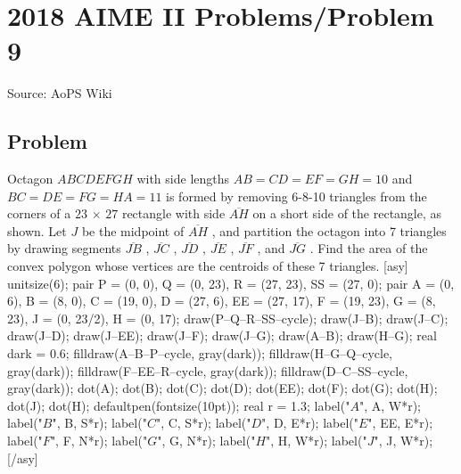 \documentclass[12pt]{article}
\begin{document}
\section*{{2018 AIME II Problems/Problem 9}}
Source: AoPS Wiki

\subsection*{Problem}
Octagon $ABCDEFGH$ with side lengths $AB = CD = EF = GH = 10$ and $BC = DE = FG = HA = 11$ is formed by removing 6-8-10 triangles from the corners of a $23$ $\times$ $27$ rectangle with side $\overline{AH}$ on a short side of the rectangle, as shown. Let $J$ be the midpoint of $\overline{AH}$ , and partition the octagon into 7 triangles by drawing segments $\overline{JB}$ , $\overline{JC}$ , $\overline{JD}$ , $\overline{JE}$ , $\overline{JF}$ , and $\overline{JG}$ . Find the area of the convex polygon whose vertices are the centroids of these 7 triangles. [asy] unitsize(6); pair P = (0, 0), Q = (0, 23), R = (27, 23), SS = (27, 0); pair A = (0, 6), B = (8, 0), C = (19, 0), D = (27, 6), EE = (27, 17), F = (19, 23), G = (8, 23), J = (0, 23/2), H = (0, 17); draw(P--Q--R--SS--cycle); draw(J--B); draw(J--C); draw(J--D); draw(J--EE); draw(J--F); draw(J--G); draw(A--B); draw(H--G); real dark = 0.6; filldraw(A--B--P--cycle, gray(dark)); filldraw(H--G--Q--cycle, gray(dark)); filldraw(F--EE--R--cycle, gray(dark)); filldraw(D--C--SS--cycle, gray(dark)); dot(A); dot(B); dot(C); dot(D); dot(EE); dot(F); dot(G); dot(H); dot(J); dot(H); defaultpen(fontsize(10pt)); real r = 1.3; label("$A$", A, W*r); label("$B$", B, S*r); label("$C$", C, S*r); label("$D$", D, E*r); label("$E$", EE, E*r); label("$F$", F, N*r); label("$G$", G, N*r); label("$H$", H, W*r); label("$J$", J, W*r); [/asy]
\end{document}
